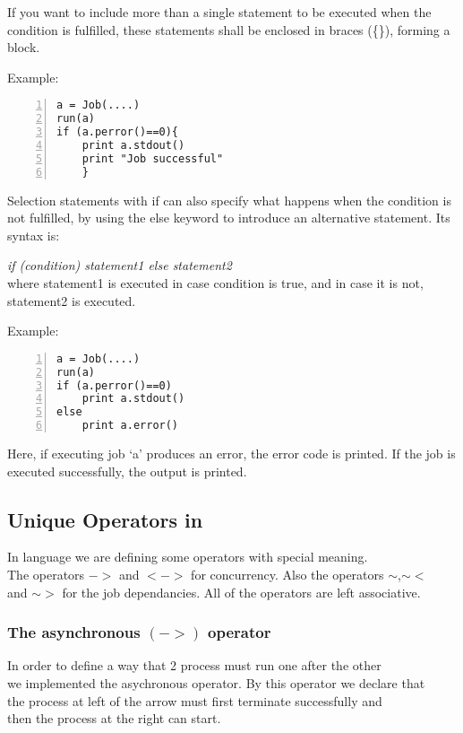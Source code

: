 If you want to include more than a single statement to be executed when the condition is fulfilled, these statements shall be enclosed in braces (\{\}), forming a block.

Example:

\begin{Verbatim}[numbers=left]
a = Job(....)
run(a)
if (a.perror()==0){
    print a.stdout()
    print "Job successful"
    }
\end{Verbatim}
Selection statements with if can also specify what happens when the condition is not fulfilled, by using the else keyword to introduce an alternative statement. Its syntax is:

\textit{if (condition) statement1 else statement2}\\
where statement1 is executed in case condition is true, and in case it is not, statement2 is executed.

Example:
\begin{Verbatim}[numbers=left]
a = Job(....)
run(a)
if (a.perror()==0)
    print a.stdout()
else
    print a.error()
\end{Verbatim}

Here, if executing job `a' produces an error, the error code is printed. If the job is executed successfully, the output is printed.



\subsection*{Unique Operators in \lang{}}

In \lang{} language we are defining some operators with special meaning.\\
The operators $->$ and $<->$ for concurrency. Also the operators $\sim$,$\sim<$\\
and $\sim>$ for the job dependancies. All of the operators are left associative.\\
\subsubsection*{The asynchronous $(->)$ operator}
In order to define a way that 2 process must run one after the other\\
we implemented the asychronous operator. By this operator we declare that\\
the process at left of the arrow must first terminate successfully and\\
then the process at the right can start.
